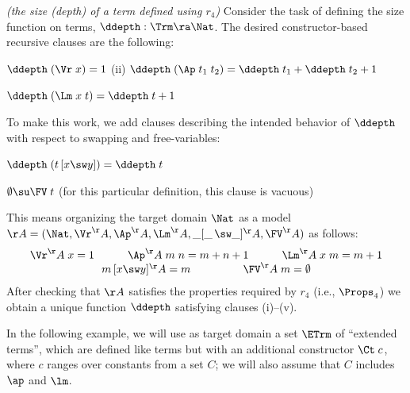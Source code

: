 \begin{exa}\rm 
	\textit{(the size (depth) of a term defined using $r_4$)} \cite{primrecFOAS-Norrish04}
	Consider the task of defining the size function on terms, 
	$\ddepth : \Trm \ra 
	\Nat$. 
	The desired constructor-based recursive clauses are the following: 
	\begin{myitem}
		\item[(i)] $\ddepth\;(\Vr\;x) = 1$
		\hspace*{7ex}
		(ii) $\ddepth\;(\Ap\;t_1\;t_2) = 
	    \ddepth\;t_1  + \ddepth\;t_2 + 1$
		\item[(iii)] 
		$\ddepth\;(\Lm\;x\;t) = 
		\ddepth\;t + 1$
	\end{myitem}
	To make this work, we add clauses describing the intended behavior of $\ddepth$ with respect to swapping and free-variables: 
	\begin{myitem}
		\item[(iv)] $\ddepth\;(t\,[x\sw y]) = \ddepth\;t$
		\item[(v)] $\emptyset \su \FV\;t $  
		(for this particular definition, this clause is vacuous) %
	\end{myitem}
	
	This means 
	organizing the target domain 
	$\Nat$ 
	as a model $\AA = (\Nat,\Vr^\AA,\Ap^\AA,\Lm^\AA,\_[\_\,\sw \_]^\AA,\FV^\AA)$ as follows:
	$$
	\begin{array}{c} 
		\Vr^\AA\;x = 1  \hspace*{7ex}
		\Ap^\AA\;m\;n = m + n + 1 \hspace*{7ex}
		\Lm^\AA\;x\;m = m + 1 
		\\
		m\,[x\sw y]^\AA = m
		\hspace*{11ex}
		\FV^\AA\;m = \emptyset
	\end{array}
	$$
	After checking that $\AA$ satisfies the properties required by $r_4$ 
	(i.e., $\Props_4$) %
	we obtain a unique function $\ddepth$ satisfying clauses (i)--(v). 
\end{exa} 


In the following example, we will use as target domain a set $\ETrm$ 
of ``extended terms'', which are defined like terms but with an 
additional constructor $\Ct\;c$, where $c$ ranges over constants from 
a set $C$; we will also assume that $C$ includes $\ap$ and $\lm$. 

